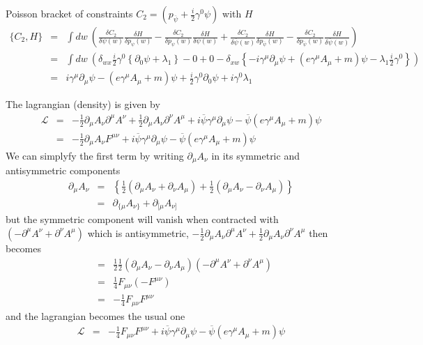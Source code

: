 \documentclass[aps,preprint,preprintnumbers,nofootinbib,showpacs,prd]{revtex4-1}
\newcommand{\nbea}{\begin{eqnarray*}}
\newcommand{\neea}{\end{eqnarray*}}
\begin{document}
Poisson bracket of constraints $C_2 = (p_{\overline\psi} + \frac{i}{2} \gamma^0 \psi)$ with $H$
%
\nbea
\{C_2, H \} & = & \int dw~ \left ( \frac{\delta C_2}{\delta \psi(w)} \frac{\delta H}{\delta p_\psi(w)} - \frac{\delta C_2}{\delta p_\psi(w)} \frac{\delta H}{\delta \psi(w)}  + \frac{\delta C_2}{\delta \overline \psi(w)} \frac{\delta H}{\delta p_{\overline \psi}(w)} - \frac{\delta C_2}{\delta p_{\overline\psi}(w)} \frac{\delta H}{\delta \overline \psi(w)} \right ) \\
& = & \int dw~ \left ( \delta_{wx} \frac{i}{2} \gamma^0 \left \{ \partial_0 \psi + \lambda_1\right \} - 0 + 0 - \delta_{xw} \left \{ -i \gamma^\mu \partial_\mu \psi + \left ( e \gamma^\mu A_\mu + m\right )\psi - \lambda_1 \frac{i}{2} \gamma^0 \right \} \right ) \\
& = & i \gamma^\mu\partial_\mu \psi - \left ( e \gamma^\mu A_\mu + m\right )\psi + \frac{i}{2} \gamma^0 \partial_0 \psi + i \gamma^0 \lambda_1
\neea
%









The lagrangian (density) is given by
%
\nbea
\mathcal{L} & = & -\frac{1}{2} \partial_\mu A_\nu \partial^\mu A^\nu + \frac{1}{2} \partial_\mu A_\nu \partial^\nu A^\mu + i \overline \psi \gamma^\mu \partial_\mu \psi - \overline \psi \left ( e \gamma^\mu A_\mu + m\right ) \psi \\
& = & -\frac{1}{2} \partial_\mu A_\nu F^{\mu\nu} + i \overline \psi \gamma^\mu \partial_\mu \psi - \overline \psi \left ( e \gamma^\mu A_\mu + m\right ) \psi
\neea
%
We can simplyfy the first term by writing $\partial_\mu A_\nu$ in its symmetric and antisymmetric components
%
\nbea
\partial_\mu A_\nu & = & \left \{ \frac{1}{2} (\partial_\mu A_\nu + \partial_\nu A_\mu) + \frac{1}{2} (\partial_\mu A_\nu - \partial_\nu A_\mu)\right \} \\
& = & \partial_{\{\mu} A_{\nu\}} + \partial_{[\mu} A_{\nu]}
\neea
%
but the symmetric component will vanish when contracted with $(- \partial^\mu A^\nu + \partial^\nu A^\mu)$ which is antisymmetric, $-\frac{1}{2} \partial_\mu A_\nu \partial^\mu A^\nu + \frac{1}{2} \partial_\mu A_\nu \partial^\nu A^\mu$ then becomes
%
\nbea
& = & \frac{1}{2} \frac{1}{2} (\partial_\mu A_\nu - \partial_\nu A_\mu) (- \partial^\mu A^\nu + \partial^\nu A^\mu) \\
& = & \frac{1}{4} F_{\mu\nu} (-F^{\mu\nu}) \\
& = & -\frac{1}{4} F_{\mu\nu} F^{\mu\nu} 
\neea
%
and the lagrangian becomes the usual one
%
\nbea
\mathcal{L} & = & -\frac{1}{4} F_{\mu\nu} F^{\mu\nu}  + i \overline \psi \gamma^\mu \partial_\mu \psi - \overline \psi \left ( e \gamma^\mu A_\mu + m\right ) \psi
\neea
%
\end{document}
